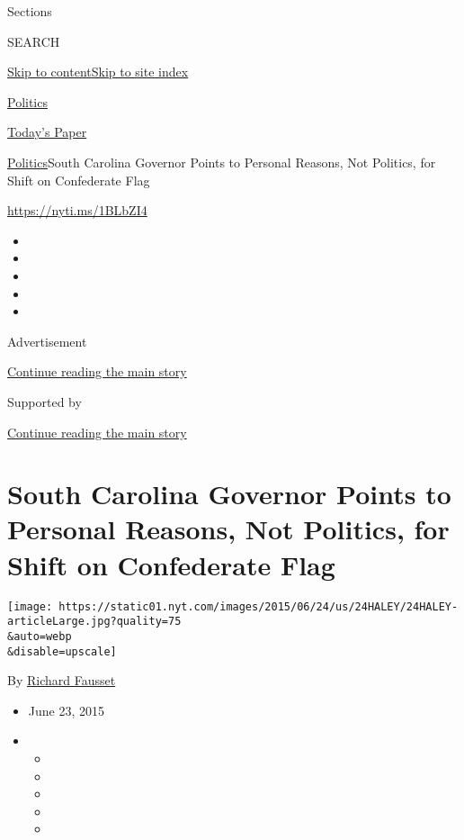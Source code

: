 Sections

SEARCH

\protect\hyperlink{site-content}{Skip to
content}\protect\hyperlink{site-index}{Skip to site index}

\href{https://www.nytimes.com/section/politics}{Politics}

\href{https://myaccount.nytimes.com/auth/login?response_type=cookie\&client_id=vi}{}

\href{https://www.nytimes.com/section/todayspaper}{Today's Paper}

\href{/section/politics}{Politics}\textbar{}South Carolina Governor
Points to Personal Reasons, Not Politics, for Shift on Confederate Flag

\url{https://nyti.ms/1BLbZI4}

\begin{itemize}
\item
\item
\item
\item
\item
\end{itemize}

Advertisement

\protect\hyperlink{after-top}{Continue reading the main story}

Supported by

\protect\hyperlink{after-sponsor}{Continue reading the main story}

\hypertarget{south-carolina-governor-points-to-personal-reasons-not-politics-for-shift-on-confederate-flag}{%
\section{South Carolina Governor Points to Personal Reasons, Not
Politics, for Shift on Confederate
Flag}\label{south-carolina-governor-points-to-personal-reasons-not-politics-for-shift-on-confederate-flag}}

\texttt{[image: https://static01.nyt.com/images/2015/06/24/us/24HALEY/24HALEY-articleLarge.jpg?quality=75\\\&auto=webp\\\&disable=upscale]}

By \href{https://www.nytimes.com/by/richard-fausset}{Richard Fausset}

\begin{itemize}
\item
  June 23, 2015
\item
  \begin{itemize}
  \item
  \item
  \item
  \item
  \item
  \end{itemize}
\end{itemize}

